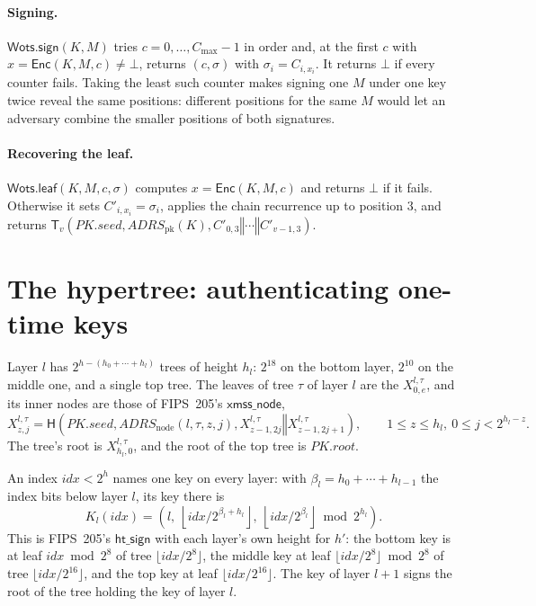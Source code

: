 \documentclass[11pt]{article}
\newcommand{\Enc}{\mathsf{Enc}}
\newcommand{\concat}{\mathbin\Vert}
\newcommand{\pkseed}{\mathit{PK.seed}}
\newcommand{\pkroot}{\mathit{PK.root}}
\newcommand{\addr}{\mathit{ADRS}}
\newcommand{\cmax}{C_{\max}}
\newcommand{\idx}{\mathit{idx}}
\newcommand{\WotsSign}{\mathsf{Wots.sign}}
\newcommand{\WotsLeaf}{\mathsf{Wots.leaf}}
\begin{document}
\paragraph{Signing.}
$\WotsSign(K,M)$ tries $c=0,\ldots,\cmax-1$ in order and, at the first $c$ with $x=\Enc(K,M,c)\neq\bot$, returns $(c,\sigma)$ with $\sigma_i=C_{i,x_i}$. It returns $\bot$ if every counter fails. Taking the least such counter makes signing one $M$ under one key twice reveal the same positions: different positions for the same $M$ would let an adversary combine the smaller positions of both signatures.

\paragraph{Recovering the leaf.}
$\WotsLeaf(K,M,c,\sigma)$ computes $x=\Enc(K,M,c)$ and returns $\bot$ if it fails. Otherwise it sets $C'_{i,x_i}=\sigma_i$, applies the chain recurrence up to position $3$, and returns $\mathsf T_v\!\left(\pkseed,\addr_{\mathrm{pk}}(K),C'_{0,3}\concat\cdots\concat C'_{v-1,3}\right)$.

\section{The hypertree: authenticating one-time keys}
\label{sec:layer}

Layer $l$ has $2^{h-(h_0+\cdots+h_l)}$ trees of height $h_l$: $2^{18}$ on the bottom layer, $2^{10}$ on the middle one, and a single top tree. The leaves of tree $\tau$ of layer $l$ are the $X^{l,\tau}_{0,e}$, and its inner nodes are those of FIPS~205's $\mathsf{xmss\_node}$,
\[
  X^{l,\tau}_{z,j}=\mathsf H\!\left(\pkseed,\addr_{\mathrm{node}}(l,\tau,z,j),X^{l,\tau}_{z-1,2j}\concat X^{l,\tau}_{z-1,2j+1}\right),\qquad 1\leq z\leq h_l,\ 0\leq j<2^{h_l-z}.
\]
The tree's root is $X^{l,\tau}_{h_l,0}$, and the root of the top tree is $\pkroot$.

An index $\idx<2^h$ names one key on every layer: with $\beta_l=h_0+\cdots+h_{l-1}$ the index bits below layer $l$, its key there is
\[
  K_l(\idx)=\left(l,\ \left\lfloor\idx/2^{\beta_l+h_l}\right\rfloor,\ \left\lfloor\idx/2^{\beta_l}\right\rfloor\bmod2^{h_l}\right).
\]
This is FIPS~205's $\mathsf{ht\_sign}$ with each layer's own height for $h'$: the bottom key is at leaf $\idx\bmod2^8$ of tree $\lfloor\idx/2^8\rfloor$, the middle key at leaf $\lfloor\idx/2^8\rfloor\bmod2^8$ of tree $\lfloor\idx/2^{16}\rfloor$, and the top key at leaf $\lfloor\idx/2^{16}\rfloor$. The key of layer $l+1$ signs the root of the tree holding the key of layer $l$.
\end{document}
